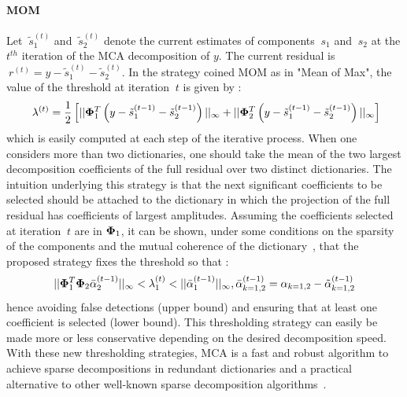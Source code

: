 \paragraph{MOM}  Let $ ~ \tilde{s}_1^{(t)}$ and $ ~ \tilde{s}_2^{(t)}$ denote the current estimates of 
components $ ~ s_1$ and $ ~ s_2$ at the $t^{th}$ iteration of the MCA decomposition of $y$. The current 
residual is $ ~ r^{(t)} = y -  \tilde{s}_1^{(t)} - \tilde{s}_2^{(t)} $. In the strategy coined MOM as in 
"Mean of Max", the value of the threshold at iteration $ ~ t$ is given by : 
\begin{equation}
\label{MOM_threshold}
 ~ 
\lambda^{(t)} = \frac{1}{2}\left[ ||{\bf \Phi}_1^T\left( y- \tilde{s}_1^{(t-1)} - \tilde{s}_2^{(t-1)} \right)||_\infty + ||{\bf \Phi}_2^T\left( y- \tilde{s}_1^{(t-1)} - \tilde{s}_2^{(t-1)} \right)||_\infty\right]
\end{equation}
which is easily computed at each step of the iterative process. When one considers more than two dictionaries, 
one should take the mean of the two largest decomposition coefficients of the full residual over two distinct dictionaries. 
The intuition underlying this strategy is that the next significant coefficients to be selected should be attached 
to the dictionary in which the projection of the full residual has coefficients of largest amplitudes. Assuming the 
coefficients selected at iteration $ ~ t$ are in ${\bf \Phi}_1$, it can be shown, under some conditions on the sparsity 
of the components and the mutual coherence of the dictionary~\cite{starck:bobin06_tip}, that the proposed strategy 
fixes the threshold so that :
\begin{equation}
\label{intuitive_choice}
||{\bf \Phi}_1^T{\bf \Phi}_2\bar{\alpha}_2^{(t-1)} ||_\infty < \lambda_1^{(t)} < ||\bar{\alpha}_1^{(t-1)} ||_\infty, \bar{\alpha}_{k=1,2}^{(t-1)}=\alpha_{k=1,2}-\tilde{\alpha}_{k=1,2}^{(t-1)}
\end{equation}
hence avoiding false detections (upper bound) and ensuring that at least one coefficient is selected (lower bound). 
This thresholding strategy can easily be made more or less conservative depending on the desired decomposition speed. 
With these new thresholding strategies, MCA is a fast and robust algorithm to achieve sparse decompositions in redundant 
dictionaries and a practical alternative to other well-known sparse decomposition algorithms~\cite{starck:bobin06_tip}. 
